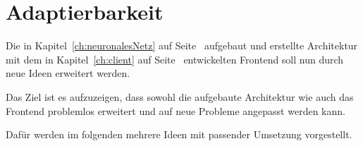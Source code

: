 \chapter{Adaptierbarkeit}
Die in Kapitel~\ref{ch:neuronalesNetz} auf Seite~\pageref{ch:neuronalesNetz} aufgebaut und erstellte Architektur mit
dem in Kapitel~\ref{ch:client} auf Seite~\pageref{ch:client} entwickelten Frontend soll nun durch neue Ideen erweitert
werden.

Das Ziel ist es aufzuzeigen, dass sowohl die aufgebaute Architektur wie auch das Frontend problemlos erweitert und auf
neue Probleme angepasst werden kann.

Dafür werden im folgenden mehrere Ideen mit passender Umsetzung vorgestellt.